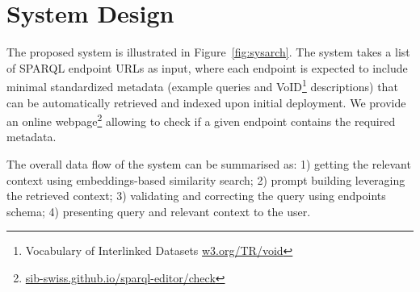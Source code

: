 \documentclass[
]{ceurart}
\begin{document}
\section{System Design}

The proposed system is illustrated in Figure~\ref{fig:sysarch}. The system takes a list of SPARQL endpoint URLs as input, where each endpoint is expected to include minimal standardized metadata (example queries and VoID\footnote{Vocabulary of Interlinked Datasets \href{https://www.w3.org/TR/void/}{w3.org/TR/void}} descriptions) that can be automatically retrieved and indexed upon initial deployment. We provide an online webpage\footnote{\href{https://sib-swiss.github.io/sparql-editor/check}{sib-swiss.github.io/sparql-editor/check}} allowing to check if a given endpoint contains the required metadata.

The overall data flow of the system can be summarised as: 1) getting the relevant context using embeddings-based similarity search; 2) prompt building leveraging the retrieved context; 3) validating and correcting the query using endpoints schema; 4) presenting query and relevant context to the user.





\end{document}
